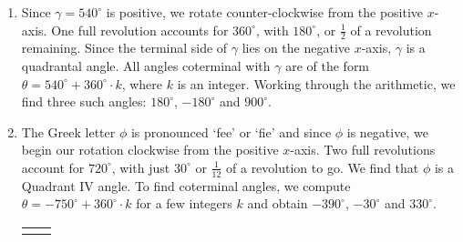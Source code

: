 \documentclass[12pt]{ximera}
\begin{document}
\begin{example}
\begin{enumerate}
\begin{center}
\end{center}

\item Since $\gamma = 540^{\circ}$ is positive, we rotate counter-clockwise from the positive $x$-axis.  One full revolution accounts for $360^{\circ}$, with $180^{\circ}$, or $\frac{1}{2}$ of a revolution remaining.  Since the terminal side of $\gamma$ lies on the negative $x$-axis, $\gamma$ is a quadrantal angle.  All angles coterminal with $\gamma$ are of the form $\theta = 540^{\circ} + 360^{\circ} \cdot k$, where $k$ is an integer.  Working through the arithmetic, we find three such angles: $180^{\circ}$, $-180^{\circ}$ and $900^{\circ}$.

\item  The Greek letter $\phi$ is pronounced `fee' or `fie' and since $\phi$ is negative, we begin our rotation clockwise from the positive $x$-axis.  Two full revolutions account for $720^{\circ}$, with just $30^{\circ}$ or $\frac{1}{12}$ of a revolution to go. We find that $\phi$ is a Quadrant IV angle. To find coterminal angles, we compute $\theta = -750^{\circ} +   360^{\circ} \cdot k$ for a few integers $k$ and obtain $-390^{\circ}$, $-30^{\circ}$ and $330^{\circ}$.

\begin{center}

\begin{tabular}{cc}

\scriptsize
\normalsize


&

\hspace{.5in}


\end{tabular}
\end{center}
\end{enumerate}
\end{example}
\end{document}
